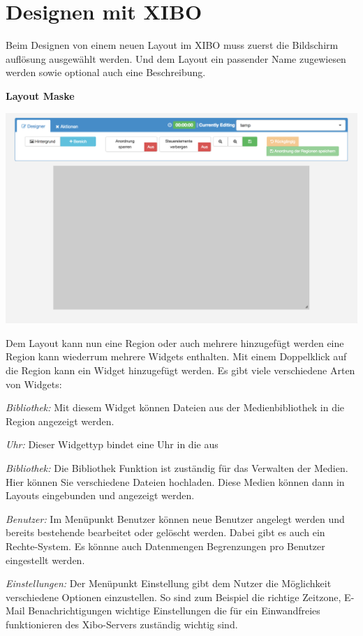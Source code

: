 \section{Designen mit XIBO}\label{sec:designexibo}
Beim Designen von einem neuen Layout im XIBO muss zuerst die Bildschirm auflösung ausgewählt werden. Und dem Layout ein passender Name zugewiesen werden sowie optional auch eine Beschreibung. 

\textbf{Layout Maske}

\begin{calendar}
	\centering
\includegraphics[width=1\textwidth]{images/xibo-basics-designer}
	\label{Calendar}
\end{calendar}	

Dem Layout kann nun eine Region oder auch mehrere  hinzugefügt werden eine Region kann wiederrum mehrere Widgets enthalten. Mit einem Doppelklick auf die Region kann ein Widget hinzugefügt werden. Es gibt viele verschiedene Arten von Widgets:

\begin{widgettypes}
	\item {\em Bibliothek:} Mit diesem Widget können Dateien aus der Medienbibliothek in die Region angezeigt werden. 

	
	\item {\em Uhr:} 
	Dieser Widgettyp bindet eine Uhr in die aus
	
	\item {\em Bibliothek:} 
	Die Bibliothek Funktion ist zuständig für das Verwalten der Medien. Hier können Sie verschiedene Dateien hochladen.  Diese Medien können dann in Layouts eingebunden und angezeigt werden.
	
	\item {\em Benutzer:} 
	Im Menüpunkt Benutzer können neue Benutzer angelegt werden und bereits bestehende bearbeitet oder gelöscht werden. Dabei gibt es auch ein Rechte-System. Es könnne auch Datenmengen Begrenzungen pro Benutzer eingestellt werden.
	
	\item {\em Einstellungen:} 
	Der Menüpunkt Einstellung gibt dem Nutzer die Möglichkeit verschiedene Optionen einzustellen. So sind zum Beispiel die richtige Zeitzone, E-Mail Benachrichtigungen wichtige Einstellungen die für ein Einwandfreies funktionieren des Xibo-Servers zuständig wichtig sind.
\end{widgettypes}

